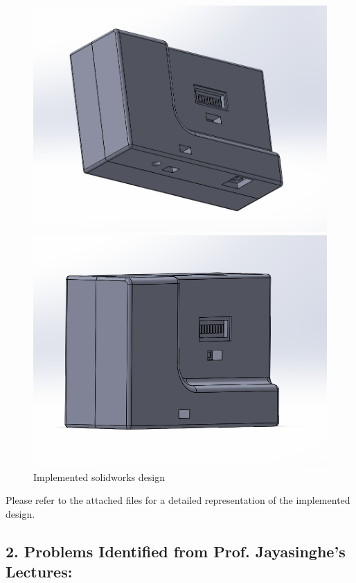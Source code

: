 \documentclass[twocolumn]{article}
\begin{document}
\begin{figure}[h]
\begin{minipage}[b]{0.2\textwidth}
\includegraphics[width=\textwidth]{3.png}
\end{minipage}
\begin{minipage}[b]{0.2\textwidth}
\includegraphics[width=\textwidth]{4.png}
\end{minipage}
\caption{Implemented solidworks design}
\end{figure}

\vspace{10cm}

\noindent Please refer to the attached files for a detailed representation of the implemented design.

\subsection*{2. Problems Identified from Prof. Jayasinghe's Lectures:}
\end{document}
